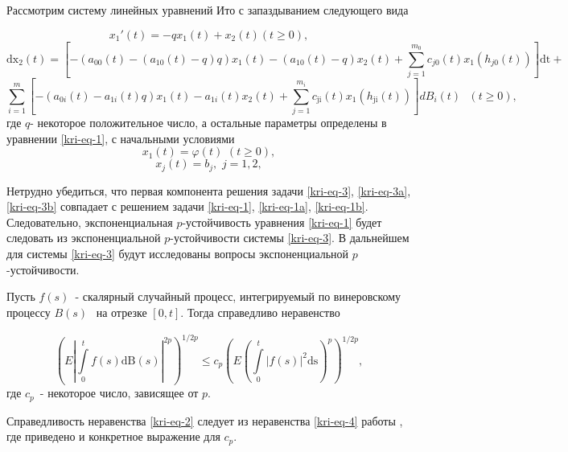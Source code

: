 Рассмотрим систему линейных уравнений Ито с запаздыванием следующего вида

\begin{equation*}
	x_1'(t)=-qx_1(t)+x_2(t)(t\ge 0),
\end{equation*}
\begin{equation}\label{kri-eq-3}
	\text{dx}_2(t)=\left[-(a_{00}(t)-(a_{10}(t)-q)q)x_1(t)-(a_{10}(t)-q)x_2(t)+\overset{m_0}{\underset{j=1}{\sum
	}}c_{\mathit{j0}}(t)x_1(h_{\mathit{j0}}(t))\right]\text{dt}+
\end{equation}
\begin{equation*}
\overset
	m{\underset{i=1}{\sum }}\left[-(a_{0i}(t)-a_{1i}(t)q)x_1(t)-a_{1i}(t)x_2(t)+\overset{m_i}{\underset{j=1}{\sum
	}}c_{\text{ji}}(t)x_1(h_{\text{ji}}(t))\right]\mathit{dB}_i(t)\text{  }(t\ge
	0),
\end{equation*}
где  $q${}- некоторое положительное число, а остальные параметры
определены в уравнении \eqref{kri-eq-1}, с начальными условиями
\begin{equation}\label{kri-eq-3a}
	x_1(t)=\varphi (t)\text{
	}(t\ge
	0),
\end{equation}
\begin{equation}\label{kri-eq-3b}
	x_j(t)=b_j,\text{
	}j=1,2,
\end{equation}

Нетрудно убедиться, что первая компонента решения задачи \eqref{kri-eq-3}, \eqref{kri-eq-3a}, \eqref{kri-eq-3b} совпадает с решением задачи \eqref{kri-eq-1}, \eqref{kri-eq-1a}, \eqref{kri-eq-1b}.
Следовательно, экспоненциальная  $p${}-устойчивость уравнения \eqref{kri-eq-1} будет следовать из экспоненциальной
$p${}-устойчивости системы \eqref{kri-eq-3}. В дальнейшем для системы \eqref{kri-eq-3} будут исследованы вопросы экспоненциальной
$p${}-устойчивости.


\begin{lemma}
 Пусть  $f(s)$\ {}- скалярный случайный процесс, интегрируемый по винеровскому процессу  $B(s)$
\textsubscript{\ }на отрезке  $[0,t]$. Тогда справедливо неравенство

\begin{equation}\label{kri-eq-4}
	\left(E|\overset t{\underset 0{\int }}f(s)\text{dB}(s)|^{2p}\right)^{1/2p}\le
	c_p\left(E\left(\overset t{\underset 0{\int
	}}|f(s)|^2\text{ds}\right)^p\right)^{1/2p},
\end{equation}
где  $c_p$\ {}- некоторое число, зависящее от  $p$.
\end{lemma}
Справедливость неравенства \eqref{kri-eq-2} следует из неравенства \eqref{kri-eq-4} работы \cite[стр. 65]{kri-bib-18}, где приведено и конкретное выражение для
$c_p$.

